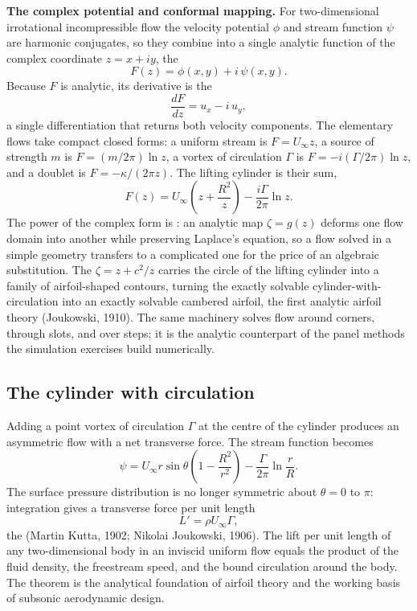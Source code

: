 \begin{mastery}
\textbf{The complex potential and conformal mapping.} For
two-dimensional irrotational incompressible flow the velocity
potential $\phi$ and stream function $\psi$ are harmonic conjugates,
so they combine into a single analytic function of the complex
coordinate $z = x + iy$, the 
\[
F(z) = \phi(x,y) + i\,\psi(x,y).
\]
Because $F$ is analytic, its derivative is the 
\[
\frac{dF}{dz} = u_x - i\,u_y,
\]
a single differentiation that returns both velocity components. The
elementary flows take compact closed forms: a uniform stream is
$F = U_\infty z$, a source of strength $m$ is $F = (m/2\pi)\ln z$, a
vortex of circulation $\Gamma$ is $F = -i(\Gamma/2\pi)\ln z$, and a
doublet is $F = -\kappa/(2\pi z)$. The lifting cylinder is their sum,
\[
F(z) = U_\infty\!\left(z + \frac{R^2}{z}\right)
- \frac{i\Gamma}{2\pi}\ln z .
\]
The power of the complex form is : an
analytic map $\zeta = g(z)$ deforms one flow domain into another while
preserving Laplace's equation, so a flow solved in a simple geometry
transfers to a complicated one for the price of an algebraic
substitution. The 
$\zeta = z + c^2/z$ carries the circle of the lifting cylinder into a
family of airfoil-shaped contours, turning the exactly solvable
cylinder-with-circulation into an exactly solvable cambered airfoil,
the first analytic airfoil theory (Joukowski, 1910). The same
machinery solves flow around corners, through slots, and over steps;
it is the analytic counterpart of the panel methods the simulation
exercises build numerically.
\end{mastery}

\subsection{The cylinder with circulation}

Adding a point vortex of circulation $\Gamma$ at the centre of the
cylinder produces an asymmetric flow with a net transverse force.
The stream function becomes
\[
\psi = U_\infty r \sin\theta\left(1 - \frac{R^2}{r^2}\right)
- \frac{\Gamma}{2\pi}\ln\frac{r}{R}.
\]
The surface pressure distribution is no longer symmetric about
$\theta = 0$ to $\pi$: integration gives a transverse force per
unit length
\[
L' = \rho U_\infty \Gamma,
\]
the  (Martin Kutta, 1902; Nikolai
Joukowski, 1906). The lift per unit length of any two-dimensional
body in an inviscid uniform flow equals the product of the fluid
density, the freestream speed, and the bound circulation around the
body. The theorem is the analytical foundation of airfoil theory
and the working basis of subsonic aerodynamic design.

